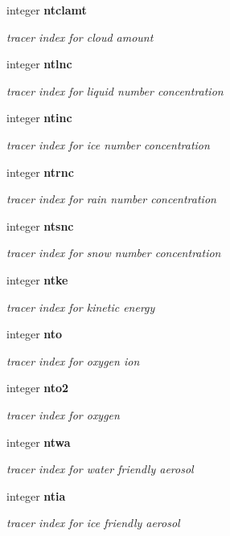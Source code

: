 \begin{DoxyCompactItemize}
integer \textbf{ ntclamt}
\begin{DoxyCompactList}\small\item\em tracer index for cloud amount \end{DoxyCompactList}\item 
integer \textbf{ ntlnc}
\begin{DoxyCompactList}\small\item\em tracer index for liquid number concentration \end{DoxyCompactList}\item 
integer \textbf{ ntinc}
\begin{DoxyCompactList}\small\item\em tracer index for ice number concentration \end{DoxyCompactList}\item 
integer \textbf{ ntrnc}
\begin{DoxyCompactList}\small\item\em tracer index for rain number concentration \end{DoxyCompactList}\item 
integer \textbf{ ntsnc}
\begin{DoxyCompactList}\small\item\em tracer index for snow number concentration \end{DoxyCompactList}\item 
integer \textbf{ ntke}
\begin{DoxyCompactList}\small\item\em tracer index for kinetic energy \end{DoxyCompactList}\item 
integer \textbf{ nto}
\begin{DoxyCompactList}\small\item\em tracer index for oxygen ion \end{DoxyCompactList}\item 
integer \textbf{ nto2}
\begin{DoxyCompactList}\small\item\em tracer index for oxygen \end{DoxyCompactList}\item 
integer \textbf{ ntwa}
\begin{DoxyCompactList}\small\item\em tracer index for water friendly aerosol \end{DoxyCompactList}\item 
integer \textbf{ ntia}
\begin{DoxyCompactList}\small\item\em tracer index for ice friendly aerosol \end{DoxyCompactList}\item 

\end{DoxyCompactItemize}
